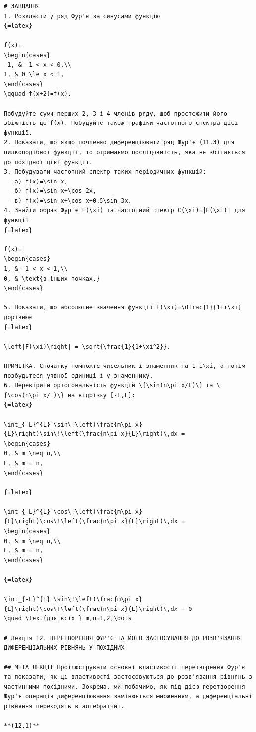 \documentclass[
  ukrainian,
]{article}
\begin{document}
\begin{verbatim}
# ЗАВДАННЯ
1. Розкласти у ряд Фур'є за синусами функцію
{=latex}

f(x)=
\begin{cases}
-1, & -1 < x < 0,\\
1, & 0 \le x < 1,
\end{cases}
\qquad f(x+2)=f(x).

Побудуйте суми перших 2, 3 і 4 членів ряду, щоб простежити його збіжність до f(x). Побудуйте також графіки частотного спектра цієї функції.
2. Показати, що якщо почленно диференціювати ряд Фур'є (11.3) для пилкоподібної функції, то отримаємо послідовність, яка не збігається до похідної цієї функції.
3. Побудувати частотний спектр таких періодичних функцій:
 - a) f(x)=\sin x,
 - б) f(x)=\sin x+\cos 2x,
 - в) f(x)=\sin x+\cos x+0.5\sin 3x.
4. Знайти образ Фур'є F(\xi) та частотний спектр C(\xi)=|F(\xi)| для функції
{=latex}

f(x)=
\begin{cases}
1, & -1 < x < 1,\\
0, & \text{в інших точках.}
\end{cases}

5. Показати, що абсолютне значення функції F(\xi)=\dfrac{1}{1+i\xi} дорівнює
{=latex}

\left|F(\xi)\right| = \sqrt{\frac{1}{1+\xi^2}}.

ПРИМІТКА. Спочатку помножте чисельник і знаменник на 1-i\xi, а потім позбудьтеся уявної одиниці i у знаменнику.
6. Перевірити ортогональність функцій \{\sin(n\pi x/L)\} та \{\cos(n\pi x/L)\} на відрізку [-L,L]:
{=latex}

\int_{-L}^{L} \sin\!\left(\frac{m\pi x}{L}\right)\sin\!\left(\frac{n\pi x}{L}\right)\,dx =
\begin{cases}
0, & m \neq n,\\
L, & m = n,
\end{cases}

{=latex}

\int_{-L}^{L} \cos\!\left(\frac{m\pi x}{L}\right)\cos\!\left(\frac{n\pi x}{L}\right)\,dx =
\begin{cases}
0, & m \neq n,\\
L, & m = n,
\end{cases}

{=latex}

\int_{-L}^{L} \sin\!\left(\frac{m\pi x}{L}\right)\cos\!\left(\frac{n\pi x}{L}\right)\,dx = 0
\quad \text{для всіх } m,n=1,2,\dots

# Лекція 12. ПЕРЕТВОРЕННЯ ФУР'Є ТА ЙОГО ЗАСТОСУВАННЯ ДО РОЗВ'ЯЗАННЯ ДИФЕРЕНЦІАЛЬНИХ РІВНЯНЬ У ПОХІДНИХ

## МЕТА ЛЕКЦІЇ Проілюструвати основні властивості перетворення Фур'є та показати, як ці властивості застосовуються до розв'язання рівнянь з частинними похідними. Зокрема, ми побачимо, як під дією перетворення Фур'є операція диференціювання замінюється множенням, а диференціальні рівняння переходять в алгебраїчні.

**(12.1)**
\end{verbatim}
\end{document}
